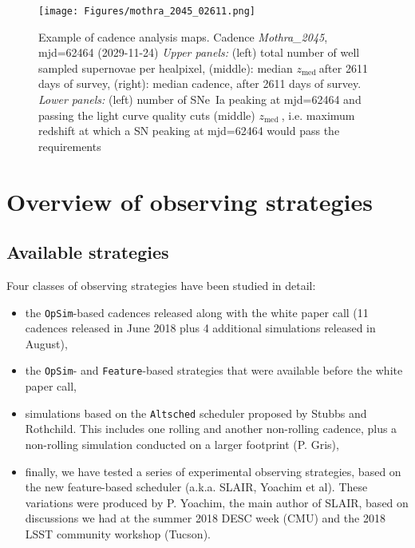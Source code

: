 \documentclass [11pt,a4paper]{article}
\newcommand{\zmed}{$z_{\mathrm{med}}\ $}
\begin{document}
\begin{figure}
    \begin{center}
      \texttt{[image: Figures/mothra\_2045\_02611.png]}
      \caption{Example of cadence analysis maps.  Cadence {\em
          Mothra\_2045}, mjd=62464 (2029-11-24) {\em Upper panels:}
        (left) total number of well sampled supernovae per healpixel,
        (middle): median \zmed after 2611 days of survey, (right):
        median cadence, after 2611 days of survey. {\em Lower panels:}
        (left) number of SNe~Ia peaking at mjd=62464 and passing the
        light curve quality cuts (middle) \zmed, i.e.  maximum
        redshift at which a SN peaking at mjd=62464 would pass the
        requirements}
    \end{center}
\end{figure}


\section{Overview of observing strategies}

\subsection{Available strategies}

Four classes of observing strategies have been studied in detail:
\begin{itemize}

\item the {\tt OpSim}-based cadences released along with the white
  paper call (11 cadences released in June 2018 plus 4 additional
  simulations released in August), 
  
\item the {\tt OpSim}- and {\tt Feature}-based strategies that were
  available before the white paper call, 

\item simulations based on the {\tt Altsched} scheduler proposed by
  Stubbs and Rothchild.  This includes one rolling and another
  non-rolling cadence, plus a non-rolling simulation conducted on a
  larger footprint (P. Gris),

\item finally, we have tested a series of experimental observing
  strategies, based on the new feature-based scheduler (a.k.a.  SLAIR,
  Yoachim et al). These variations were produced by P. Yoachim, the
  main author of SLAIR, based on discussions we had at the summer 2018
  DESC week (CMU) and the 2018 LSST community workshop (Tucson).
\end{itemize}
\end{document}
